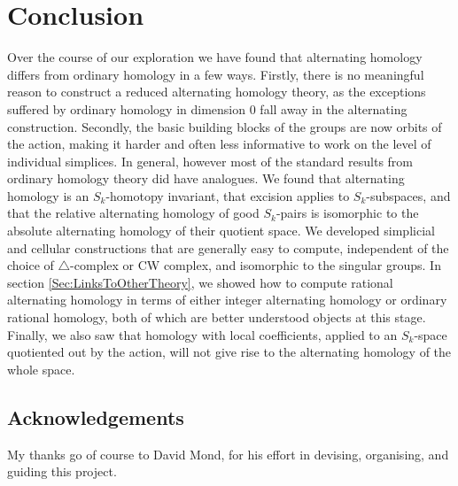 \documentclass[11pt,a4paper,twoside]{article}
\theoremstyle{plain}
\theoremstyle{definition}
\theoremstyle{definition}
\theoremstyle{definition}
\theoremstyle{definition}
\theoremstyle{definition}
\begin{document}
\section{Conclusion}
Over the course of our exploration we have found that alternating homology differs from ordinary homology in a few ways. Firstly, there is no meaningful reason to construct a reduced alternating homology theory, as the exceptions suffered by ordinary homology in dimension $0$ fall away in the alternating construction. Secondly, the basic building blocks of the groups are now orbits of the action, making it harder and often less informative to work on the level of individual simplices. In general, however most of the standard results from ordinary homology theory did have analogues. We found that alternating homology is an $S_k$-homotopy invariant, that excision applies to $S_k$-subspaces, and that the relative alternating homology of good $S_k$-pairs is isomorphic to the absolute alternating homology of their quotient space. We developed simplicial and cellular constructions that are generally easy to compute, independent of the choice of $\triangle$-complex or CW complex, and isomorphic to the singular groups. In section \ref{Sec:LinksToOtherTheory}, we showed how to compute rational alternating homology in terms of either integer alternating homology or ordinary rational homology, both of which are better understood objects at this stage. Finally, we also saw that homology with local coefficients, applied to an $S_k$-space quotiented out by the action, will not give rise to the alternating homology of the whole space.


\pagebreak
\subsection*{Acknowledgements}
My thanks go of course to David Mond, for his effort in devising, organising, and guiding this project.


\bigskip



\end{document}
